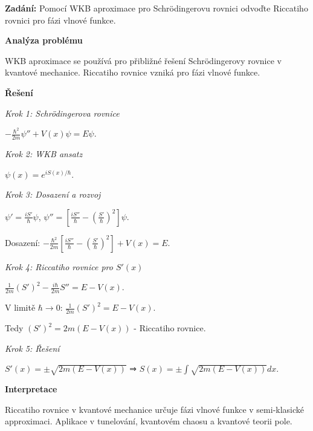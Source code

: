 \vspace{2\baselineskip}

\begin{example}
\label{ex:c3-stredni-kvantova}

\noindent\textbf{Zadání:} Pomocí WKB aproximace pro Schrödingerovu rovnici odvoďte Riccatiho rovnici pro fázi vlnové funkce.

\vspace{1.5\baselineskip}

\noindent\textbf{Analýza problému}

\noindent WKB aproximace se používá pro přibližné řešení Schrödingerovy rovnice v kvantové mechanice. Riccatiho rovnice vzniká pro fázi vlnové funkce.

\vspace{1.5\baselineskip}

\noindent\textbf{Řešení}

\noindent\textit{Krok 1: Schrödingerova rovnice}

$-\frac{\hbar^2}{2m}\psi'' + V(x)\psi = E\psi$.

\noindent\textit{Krok 2: WKB ansatz}

$\psi(x) = e^{iS(x)/\hbar}$.

\noindent\textit{Krok 3: Dosazení a rozvoj}

$\psi' = \frac{iS'}{\hbar}\psi$, $\psi'' = \left[\frac{iS''}{\hbar} - \left(\frac{S'}{\hbar}\right)^2\right]\psi$.

Dosazení: $-\frac{\hbar^2}{2m}\left[\frac{iS''}{\hbar} - \left(\frac{S'}{\hbar}\right)^2\right] + V(x) = E$.

\noindent\textit{Krok 4: Riccatiho rovnice pro $S'(x)$}

$\frac{1}{2m}(S')^2 - \frac{i\hbar}{2m}S'' = E - V(x)$.

V limitě $\hbar \to 0$: $\frac{1}{2m}(S')^2 = E - V(x)$.

Tedy $(S')^2 = 2m(E - V(x))$ - Riccatiho rovnice.

\noindent\textit{Krok 5: Řešení}

$S'(x) = \pm \sqrt{2m(E - V(x))}$ ⇒ $S(x) = \pm \int \sqrt{2m(E - V(x))}dx$.

\vspace{1.5\baselineskip}

\noindent\textbf{Interpretace}

Riccatiho rovnice v kvantové mechanice určuje fázi vlnové funkce v semi-klasické 
approximaci. Aplikace v tunelování, kvantovém chaosu a kvantové teorii pole.

\end{example}

